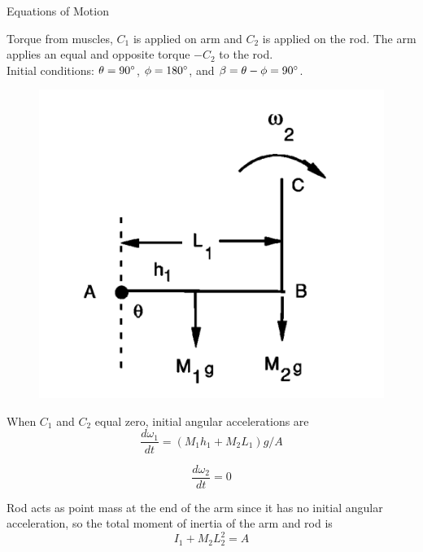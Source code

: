 \documentclass[tikz]{beamer}
\begin{document}
\begin{frame} {Equations of Motion}
	\only<4> {
		Torque from muscles, $C_1$ is applied on arm and $C_2$ is applied on the rod. The arm applies an equal and opposite torque $-C_2$ to the rod. \\
		Initial conditions: $\theta = 90\degree$, $\phi = 180\degree$, and $\beta = \theta - \phi = 90\degree$.

		\begin{figure}
			\centering
			\includegraphics[scale=0.4]{wristcock.png}
		\end{figure}
	}

	 {
		When $C_1$ and $C_2$ equal zero, initial angular accelerations are
		\begin{equation}
			\frac{d \omega_1}{dt} = (M_1 h_1 + M_2 L_1)g/A \tag{7}
		\end{equation}

		\begin{equation}
			\frac{d \omega_2}{dt} = 0 \tag{8}
		\end{equation}

		Rod acts as point mass at the end of the arm since it has no initial angular acceleration, so the total moment of inertia of the arm and rod is
		\begin{equation}
			I_1 +M_2 L_2^2 = A \tag{9}
		\end{equation}

	}


\end{frame}
\end{document}

